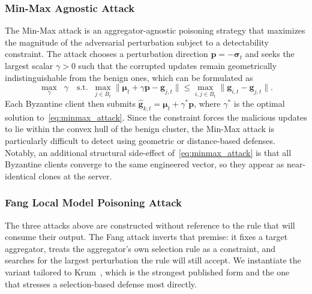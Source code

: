 \documentclass[journal]{IEEEtran}
\begin{document}
\subsubsection{Min-Max Agnostic Attack~\cite{shejwalkar2021manipulating}}
The Min-Max attack is an aggregator-agnostic poisoning strategy that maximizes the magnitude of the adversarial perturbation subject to a detectability constraint. The attack chooses a perturbation direction $\mathbf{p} = -\boldsymbol{\sigma}_t$ and seeks the largest scalar $\gamma > 0$ such that the corrupted updates remain geometrically indistinguishable from the benign ones, which can be formulated as
\begin{equation}
\max_{\gamma} \;\; \gamma \quad \text{s.t.} \;\; \max_{j \in B_t} \|\boldsymbol{\mu}_t + \gamma \mathbf{p} - \mathbf{g}_{j,t}\| \leq \max_{i,j \in B_t} \|\mathbf{g}_{i,t} - \mathbf{g}_{j,t}\|.
\label{eq:minmax_attack}
\end{equation}
Each Byzantine client then submits $\hat{\mathbf{g}}_{k,t} = \boldsymbol{\mu}_t + \gamma^* \mathbf{p}$, where $\gamma^*$ is the optimal solution to~\eqref{eq:minmax_attack}. Since the constraint forces the malicious updates to lie within the convex hull of the benign cluster, the Min-Max attack is particularly difficult to detect using geometric or distance-based defenses. Notably, an additional structural side-effect of~\eqref{eq:minmax_attack} is that all Byzantine clients converge to the same engineered vector, so they appear as near-identical clones at the server.

\subsubsection{Fang Local Model Poisoning Attack~\cite{fang2020local}}
\label{sec:fang_attack}
The three attacks above are constructed without reference to the rule that will consume their output. The Fang attack inverts that premise: it fixes a target aggregator, treats the aggregator's own selection rule as a constraint, and searches for the largest perturbation the rule will still accept. We instantiate the variant tailored to Krum~\cite{blanchard2017machine}, which is the strongest published form and the one that stresses a selection-based defense most directly.
\end{document}
